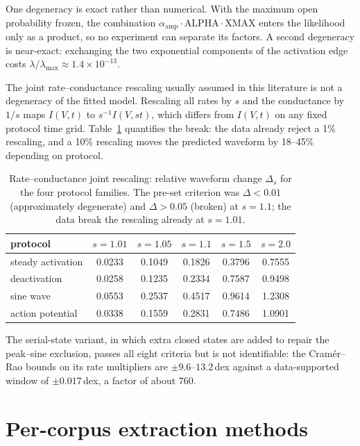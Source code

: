 \documentclass[11pt,a4paper]{article}
\begin{document}
One degeneracy is exact rather than numerical. With the maximum open
probability frozen, the combination
$\alpha_{\mathrm{amp}}\cdot\mathrm{ALPHA}\cdot\mathrm{XMAX}$ enters the
likelihood only as a product, so no experiment can separate its factors. A
second degeneracy is near-exact: exchanging the two exponential components of
the activation edge costs
$\lambda/\lambda_{\max}\approx1.4\times10^{-13}$.

The joint rate--conductance rescaling usually assumed in this literature is
not a degeneracy of the fitted model. Rescaling all rates by $s$ and the
conductance by $1/s$ maps $I(V,t)$ to $s^{-1}I(V,st)$, which differs from
$I(V,t)$ on any fixed protocol time grid. Table~\ref{tab:rescale} quantifies
the break: the data already reject a 1\% rescaling, and a 10\% rescaling moves
the predicted waveform by 18--45\% depending on protocol.

\begin{table}[htbp]\centering\small
\caption{Rate--conductance joint rescaling: relative waveform change
$\Delta_s$ for the four protocol families. The pre-set criterion was
$\Delta<0.01$ (approximately degenerate) and $\Delta>0.05$ (broken) at
$s=1.1$; the data break the rescaling already at $s=1.01$.}
\label{tab:rescale}
\begin{tabular}{@{}lccccc@{}}
\toprule
protocol & $s=1.01$ & $s=1.05$ & $s=1.1$ & $s=1.5$ & $s=2.0$ \\
\midrule
steady activation & 0.0233 & 0.1049 & 0.1826 & 0.3796 & 0.7555 \\
deactivation & 0.0258 & 0.1235 & 0.2334 & 0.7587 & 0.9498 \\
sine wave & 0.0553 & 0.2537 & 0.4517 & 0.9614 & 1.2308 \\
action potential & 0.0338 & 0.1559 & 0.2831 & 0.7486 & 1.0901 \\
\bottomrule
\end{tabular}
\end{table}

The serial-state variant, in which extra closed states are added to repair the
peak--sine exclusion, passes all eight criteria but is not identifiable: the
Cram\'er--Rao bounds on its rate multipliers are $\pm9.6$--$13.2$\,dex against
a data-supported window of $\pm0.017$\,dex, a factor of about 760.

\FloatBarrier
\section{Per-corpus extraction methods}
\end{document}

